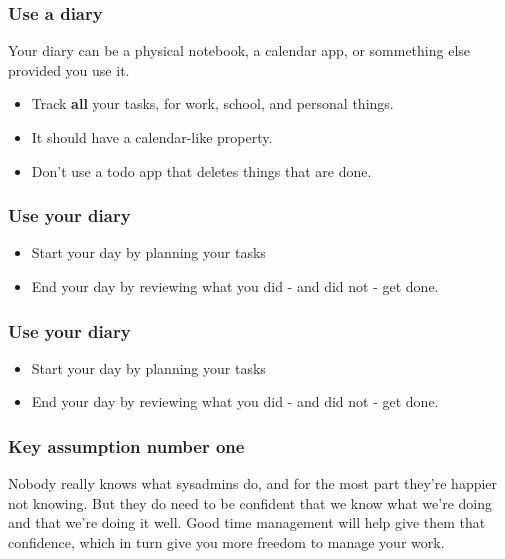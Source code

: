 \documentclass[10pt]{beamer}
\begin{document}
\begin{frame}
  \frametitle{Use a diary}

  Your diary can be a physical notebook, a calendar app, or sommething
  else provided you use it. 
  
  \begin{itemize}
    \item Track \textbf{all} your tasks, for work, school, and personal things.
    \item It should have a calendar-like property.
    \item Don't use a todo app that deletes things that are done.
  \end{itemize}
    
\end{frame}

\begin{frame}
  \frametitle{Use your diary}
 
   \begin{itemize}
    \item Start your day by planning your tasks
    \item End your day by reviewing what you did - and did not - get done.
  \end{itemize}
        
\end{frame}

\begin{frame}
  \frametitle{Use your diary}
 
   \begin{itemize}
    \item Start your day by planning your tasks
    \item End your day by reviewing what you did - and did not - get done.
  \end{itemize}
        
\end{frame}

\begin{frame}
  \frametitle{Key assumption number one}

  Nobody really knows what sysadmins do, and for the most part they're happier 
  not knowing. But they do need to be confident that we know what we're doing and
  that we're doing it well. Good time management will help give them that confidence, 
  which in turn give you more freedom to manage your work.
    
\end{frame}
\end{document}

